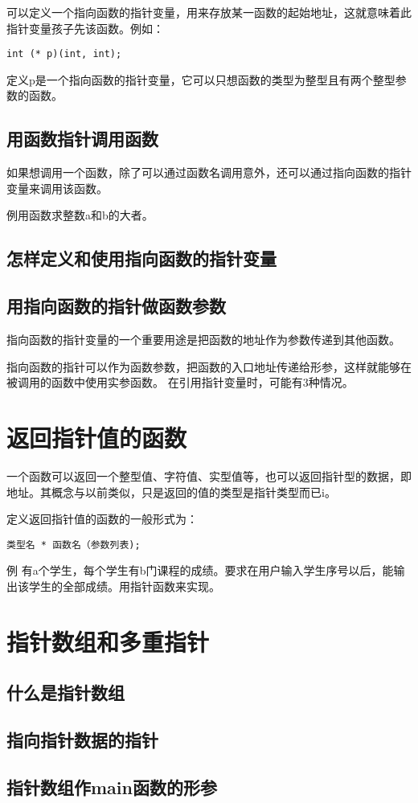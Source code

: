 可以定义一个指向函数的指针变量，用来存放某一函数的起始地址，这就意味着此指针变量孩子先该函数。例如：
\begin{lstlisting}
int (* p)(int, int);
\end{lstlisting}
定义p是一个指向函数的指针变量，它可以只想函数的类型为整型且有两个整型参数的函数。
\subsection{用函数指针调用函数}
如果想调用一个函数，除了可以通过函数名调用意外，还可以通过指向函数的指针变量来调用该函数。

例用函数求整数a和b的大者。
\subsection{怎样定义和使用指向函数的指针变量}
\subsection{用指向函数的指针做函数参数}
指向函数的指针变量的一个重要用途是把函数的地址作为参数传递到其他函数。

指向函数的指针可以作为函数参数，把函数的入口地址传递给形参，这样就能够在被调用的函数中使用实参函数。
在引用指针变量时，可能有3种情况。
\section{返回指针值的函数}
一个函数可以返回一个整型值、字符值、实型值等，也可以返回指针型的数据，即地址。其概念与以前类似，只是返回的值的类型是指针类型而已i。

定义返回指针值的函数的一般形式为：
\begin{lstlisting}
类型名 * 函数名（参数列表);
\end{lstlisting}
例 有a个学生，每个学生有b门课程的成绩。要求在用户输入学生序号以后，能输出该学生的全部成绩。用指针函数来实现。
\section{指针数组和多重指针}
\subsection{什么是指针数组}
\subsection{指向指针数据的指针}
\subsection{指针数组作main函数的形参}

